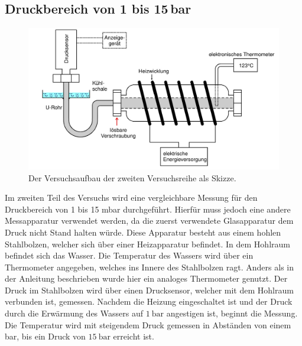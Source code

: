 \subsection{Druckbereich von 1 bis 15\,bar}
\begin{figure}[H]
    \centering
    \includegraphics[scale=0.5]{screen3.jpg}
    \caption{Der Versuchsaufbau der zweiten Versuchsreihe als Skizze.}
\end{figure}
Im zweiten Teil des Versuchs wird eine vergleichbare Messung für den Druckbereich von 1 bis 15 mbar durchgeführt.
Hierfür muss jedoch eine andere Messapparatur verwendet werden, da die zuerst verwendete Glasapparatur dem Druck nicht Stand halten würde.
Diese Apparatur besteht aus einem hohlen Stahlbolzen, welcher sich über einer Heizapparatur befindet.
In dem Hohlraum befindet sich das Wasser.
Die Temperatur des Wassers wird über ein Thermometer angegeben, welches ins Innere des Stahlbolzen ragt.
Anders als in der Anleitung beschrieben wurde hier ein analoges Thermometer genutzt.
Der Druck im Stahlbolzen wird über einen Drucksensor, welcher mit dem Hohlraum verbunden ist, gemessen.
\noindent
Nachdem die Heizung eingeschaltet ist und der Druck durch die Erwärmung des Wassers auf $\SI{1}{\bar}$ angestigen ist, 
beginnt die Messung.
Die Temperatur wird mit steigendem Druck gemessen in Abständen von einem bar, bis ein Druck von $\SI{15}{\bar}$ erreicht ist.